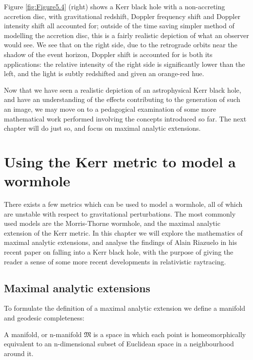 \documentclass[oneside,openright,frontopenright, singlespacing]{dmathesis}
\begin{document}
	Figure \ref{fig:Figure5.4} (right) shows a Kerr black hole with a non-accreting accretion disc, with gravitational redshift, Doppler frequency shift and Doppler intensity shift all accounted for; outside of the time saving simpler method of modelling the accretion disc, this is a fairly realistic depiction of what an observer would see. We see that on the right side, due to the retrograde orbits near the shadow of the event horizon, Doppler shift is accounted for is both its applications: the relative intensity of the right side is significantly lower than the left, and the light is subtly redshifted and given an orange-red hue.

\vspace{1em}
	Now that we have seen a realistic depiction of an astrophysical Kerr black hole, and have an understanding of the effects contributing to the generation of such an image, we may move on to a pedagogical examination of some more mathematical work performed involving the concepts introduced so far. The next chapter will do just so, and focus on maximal analytic extensions.




\chapter{Using the Kerr metric to model a wormhole}\label{chap:Chapter6}

	There exists a few metrics which can be used to model a wormhole, all of which are unstable with respect to gravitational perturbations\cite{penrose1968structure}. The most commonly used models are the Morris-Thorne wormhole\cite{morris1988wormholes}, and the maximal analytic extension of the Kerr metric. In this chapter we will explore the mathematics of maximal analytic extensions, and analyse the findings of Alain Riazuelo in his recent paper on falling into a Kerr black hole\cite{seeingRelativity}, with the purpose of giving the reader a sense of some more recent developments in relativistic raytracing.

\section{Maximal analytic extensions}\label{sec:Section6.1}

	To formulate the definition of a maximal analytic extension we define a manifold and geodesic completeness:

\vspace{1em}
	A manifold, or n-manifold $\mathfrak{M}$ is a space in which each point is homeomorphically equivalent to an n-dimensional subset of Euclidean space in a neighbourhood around it.
\end{document}
